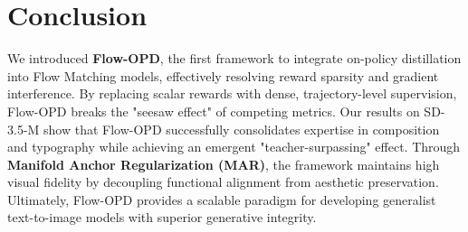 \section{Conclusion}

We introduced \textbf{Flow-OPD}, the first framework to integrate on-policy distillation into Flow Matching models, effectively resolving reward sparsity and gradient interference. By replacing scalar rewards with dense, trajectory-level supervision, Flow-OPD breaks the "seesaw effect" of competing metrics.
%
Our results on SD-3.5-M show that Flow-OPD successfully consolidates expertise in composition and typography while achieving an emergent "teacher-surpassing" effect. Through \textbf{Manifold Anchor Regularization (MAR)}, the framework maintains high visual fidelity by decoupling functional alignment from aesthetic preservation. Ultimately, Flow-OPD provides a scalable paradigm for developing generalist text-to-image models with superior generative integrity.